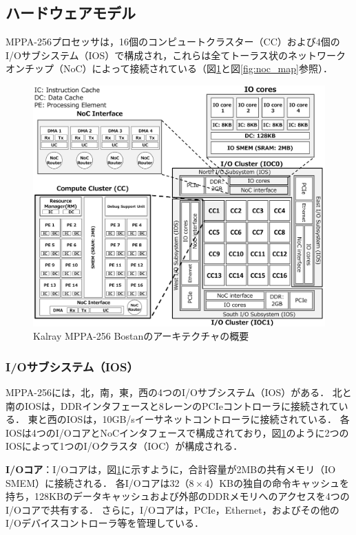 \documentclass[submit,techrep]{ipsj_v2/UTF8/ipsj}
\begin{document}
\subsection{ハードウェアモデル}
\label{sec:hardware_model}
MPPA-256プロセッサは，16個のコンピュートクラスター（CC）および4個のI/Oサブシステム（IOS）で構成され，これらは全てトーラス状のネットワークオンチップ（NoC）によって接続されている（図\ref{fig:mppa_architecture}と図\ref{fig:noc_map}参照）．

\begin{figure}[t]
  \centering
  \includegraphics[width=1.0\linewidth]{../figure/mppa_architecture.pdf}
  \caption{\label{fig:mppa_architecture}
    Kalray MPPA-256 Bostanのアーキテクチャの概要}
\end{figure}

\setlength{\headheight}{0pt}

\subsubsection{I/Oサブシステム（IOS）}
\label{sec:ios}
MPPA-256には，北，南，東，西の4つのI/Oサブシステム（IOS）がある．
北と南のIOSは，DDRインタフェースと8レーンのPCIeコントローラに接続されている．
東と西のIOSは，10GB/sイーサネットコントローラに接続されている．
各IOSは4つのI/OコアとNoCインタフェースで構成されており，図\ref{fig:mppa_architecture}のように2つのIOSによって1つのI/Oクラスタ（IOC）が構成される．

\textbf{I/Oコア}：I/Oコアは，図\ref{fig:mppa_architecture}に示すように，合計容量が2MBの共有メモリ（IO SMEM）に接続される．
各I/Oコアは32（$ 8 \times 4 $）KBの独自の命令キャッシュを持ち，128KBのデータキャッシュおよび外部のDDRメモリへのアクセスを4つのI/Oコアで共有する．
さらに，I/Oコアは，PCIe，Ethernet，およびその他のI/Oデバイスコントローラ等を管理している．
\end{document}
